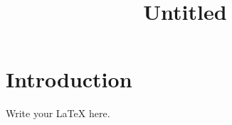 \documentclass[11pt]{article}
\title{Untitled}
\author{}
\begin{document}
\maketitle

\section{Introduction}
Write your \LaTeX{} here.
\end{document}
